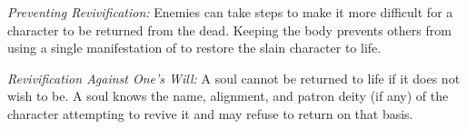 \textit{Preventing Revivification:} Enemies can take steps to make it more difficult for a character to be returned from the dead. Keeping the body prevents others from using a single manifestation of  to restore the slain character to life.

\textit{Revivification Against One's Will:} A soul cannot be returned to life if it does not wish to be. A soul knows the name, alignment, and patron deity (if any) of the character attempting to revive it and may refuse to return on that basis.